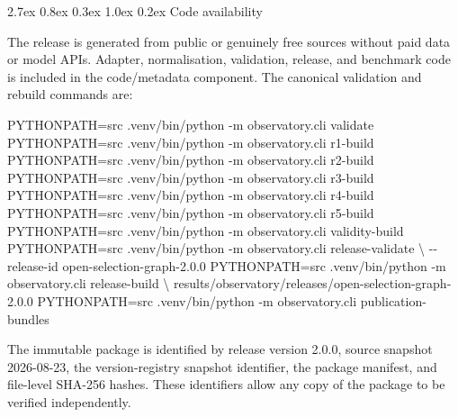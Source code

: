 \documentclass[
  10pt,
]{article}
\makeatletter
\newenvironment{Shaded}{}{}
\newcommand{\AttributeTok}[1]{\textcolor[rgb]{0.49,0.56,0.16}{#1}}
\newcommand{\DataTypeTok}[1]{\textcolor[rgb]{0.56,0.13,0.00}{#1}}
\newcommand{\ExtensionTok}[1]{#1}
\newcommand{\NormalTok}[1]{#1}
\newcommand{\OperatorTok}[1]{\textcolor[rgb]{0.40,0.40,0.40}{#1}}
\newcommand{\VariableTok}[1]{\textcolor[rgb]{0.10,0.09,0.49}{#1}}
\renewcommand\section{\@startsection{section}{1}{\z@}%
  {2.7ex \@plus 0.8ex \@minus 0.3ex}%
  {1.0ex \@plus 0.2ex}%
  {\normalfont\Large\sffamily\bfseries\color{OSGInk}}}
\makeatother
\begin{document}
\section{Code availability}\label{code-availability}

The release is generated from public or genuinely free sources without
paid data or model APIs. Adapter, normalisation, validation, release,
and benchmark code is included in the code/metadata component. The
canonical validation and rebuild commands are:

\begin{Shaded}
\begin{Highlighting}[]
\VariableTok{PYTHONPATH}\OperatorTok{=}\NormalTok{src }\ExtensionTok{.venv/bin/python} \AttributeTok{{-}m}\NormalTok{ observatory.cli validate}
\VariableTok{PYTHONPATH}\OperatorTok{=}\NormalTok{src }\ExtensionTok{.venv/bin/python} \AttributeTok{{-}m}\NormalTok{ observatory.cli r1{-}build}
\VariableTok{PYTHONPATH}\OperatorTok{=}\NormalTok{src }\ExtensionTok{.venv/bin/python} \AttributeTok{{-}m}\NormalTok{ observatory.cli r2{-}build}
\VariableTok{PYTHONPATH}\OperatorTok{=}\NormalTok{src }\ExtensionTok{.venv/bin/python} \AttributeTok{{-}m}\NormalTok{ observatory.cli r3{-}build}
\VariableTok{PYTHONPATH}\OperatorTok{=}\NormalTok{src }\ExtensionTok{.venv/bin/python} \AttributeTok{{-}m}\NormalTok{ observatory.cli r4{-}build}
\VariableTok{PYTHONPATH}\OperatorTok{=}\NormalTok{src }\ExtensionTok{.venv/bin/python} \AttributeTok{{-}m}\NormalTok{ observatory.cli r5{-}build}
\VariableTok{PYTHONPATH}\OperatorTok{=}\NormalTok{src }\ExtensionTok{.venv/bin/python} \AttributeTok{{-}m}\NormalTok{ observatory.cli validity{-}build}
\VariableTok{PYTHONPATH}\OperatorTok{=}\NormalTok{src }\ExtensionTok{.venv/bin/python} \AttributeTok{{-}m}\NormalTok{ observatory.cli release{-}validate }\DataTypeTok{\textbackslash{}}
  \AttributeTok{{-}{-}release{-}id}\NormalTok{ open{-}selection{-}graph{-}2.0.0}
\VariableTok{PYTHONPATH}\OperatorTok{=}\NormalTok{src }\ExtensionTok{.venv/bin/python} \AttributeTok{{-}m}\NormalTok{ observatory.cli release{-}build }\DataTypeTok{\textbackslash{}}
\NormalTok{  results/observatory/releases/open{-}selection{-}graph{-}2.0.0}
\VariableTok{PYTHONPATH}\OperatorTok{=}\NormalTok{src }\ExtensionTok{.venv/bin/python} \AttributeTok{{-}m}\NormalTok{ observatory.cli publication{-}bundles}
\end{Highlighting}
\end{Shaded}

The immutable package is identified by release version 2.0.0, source
snapshot 2026-08-23, the version-registry snapshot identifier, the
package manifest, and file-level
SHA-256 hashes. These identifiers allow any copy of the package to be
verified independently.
\end{document}
